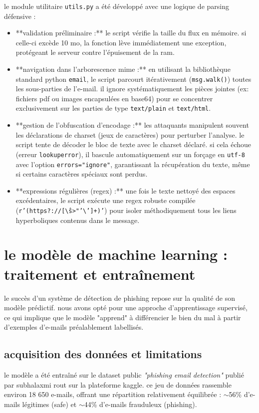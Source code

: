 \documentclass[12pt,a4paper]{report}
\begin{document}
le module utilitaire \texttt{utils.py} a été développé avec une logique de parsing défensive :
\begin{itemize}
    \item **validation préliminaire :** le script vérifie la taille du flux en mémoire. si celle-ci excède 10 mo, la fonction lève immédiatement une exception, protégeant le serveur contre l'épuisement de la ram.
    \item **navigation dans l'arborescence mime :** en utilisant la bibliothèque standard python \texttt{email}, le script parcourt itérativement (\texttt{msg.walk()}) toutes les sous-parties de l'e-mail. il ignore systématiquement les pièces jointes (ex: fichiers pdf ou images encapsulées en base64) pour se concentrer exclusivement sur les parties de type \texttt{text/plain} et \texttt{text/html}.
    \item **gestion de l'obfuscation d'encodage :** les attaquants manipulent souvent les déclarations de charset (jeux de caractères) pour perturber l'analyse. le script tente de décoder le bloc de texte avec le charset déclaré. si cela échoue (erreur \texttt{lookuperror}), il bascule automatiquement sur un forçage en \texttt{utf-8} avec l'option \texttt{errors="ignore"}, garantissant la récupération du texte, même si certains caractères spéciaux sont perdus.
    \item **expressions régulières (regex) :** une fois le texte nettoyé des espaces excédentaires, le script exécute une regex robuste compilée (\texttt{r'(https?://[\^\textbackslash s>"'\textbackslash ']+)'}) pour isoler méthodiquement tous les liens hyperboliques contenus dans le message.
\end{itemize}

\section{le modèle de machine learning : traitement et entraînement}
le succès d'un système de détection de phishing repose sur la qualité de son modèle prédictif. nous avons opté pour une approche d'apprentissage supervisé, ce qui implique que le modèle "apprend" à différencier le bien du mal à partir d'exemples d'e-mails préalablement labellisés.

\subsection{acquisition des données et limitations}
le modèle a été entraîné sur le dataset public \textit{"phishing email detection"} publié par subhalaxmi rout sur la plateforme kaggle. ce jeu de données rassemble environ 18 650 e-mails, offrant une répartition relativement équilibrée : $\sim$56\% d'e-mails légitimes (safe) et $\sim$44\% d'e-mails frauduleux (phishing).
\end{document}
